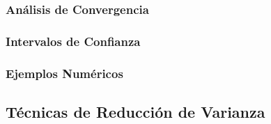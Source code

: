 
\subsubsection{Análisis de Convergencia}


\subsubsection{Intervalos de Confianza}


\subsubsection{Ejemplos Numéricos}


\subsection{Técnicas de Reducción de Varianza}

